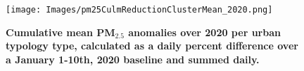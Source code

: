 \documentclass[preprint,12pt]{elsarticle}
\begin{document}
\begin{figure}
\centering
\texttt{[image: Images/pm25CulmReductionClusterMean\_2020.png]}
\caption{\bf  Cumulative mean PM$_{2.5}$ anomalies over 2020 per urban typology type, calculated as a daily percent difference over a January 1-10th, 2020 baseline and summed daily.}
 \label{fig:pm25}
\end{figure}



%
%
%
%
\end{document}
